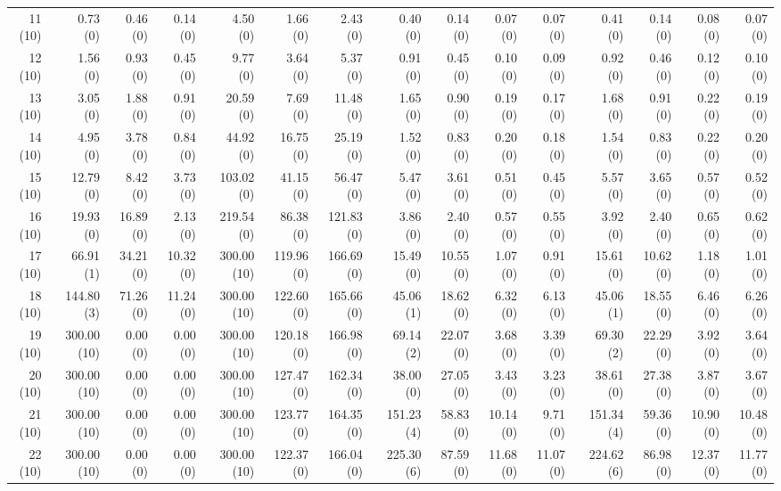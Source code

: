 \documentclass[11pt,fleqn,twoside]{article}
\begin{document}
{\begin{table}[t]
\begin{tabular}[t]{|r|r|r|r|r|r|r|r|r|r|r|r|r|r|r|}
11 (10) & 0.73 ~~(0) & 0.46 (0) & 0.14 (0) & 4.50 ~~(0) & 1.66 (0) & 2.43 (0) & 0.40 ~~(0) & 0.14 (0) & 0.07 (0) & 0.07 (0) & 0.41 ~~(0) & 0.14 (0) & 0.08 (0) & 0.07 (0) \\
12 (10) & 1.56 ~~(0) & 0.93 (0) & 0.45 (0) & 9.77 ~~(0) & 3.64 (0) & 5.37 (0) & 0.91 ~~(0) & 0.45 (0) & 0.10 (0) & 0.09 (0) & 0.92 ~~(0) & 0.46 (0) & 0.12 (0) & 0.10 (0) \\
13 (10) & 3.05 ~~(0) & 1.88 (0) & 0.91 (0) & 20.59 ~~(0) & 7.69 (0) & 11.48 (0) & 1.65 ~~(0) & 0.90 (0) & 0.19 (0) & 0.17 (0) & 1.68 ~~(0) & 0.91 (0) & 0.22 (0) & 0.19 (0) \\
14 (10) & 4.95 ~~(0) & 3.78 (0) & 0.84 (0) & 44.92 ~~(0) & 16.75 (0) & 25.19 (0) & 1.52 ~~(0) & 0.83 (0) & 0.20 (0) & 0.18 (0) & 1.54 ~~(0) & 0.83 (0) & 0.22 (0) & 0.20 (0) \\
15 (10) & 12.79 ~~(0) & 8.42 (0) & 3.73 (0) & 103.02 ~~(0) & 41.15 (0) & 56.47 (0) & 5.47 ~~(0) & 3.61 (0) & 0.51 (0) & 0.45 (0) & 5.57 ~~(0) & 3.65 (0) & 0.57 (0) & 0.52 (0) \\
16 (10) & 19.93 ~~(0) & 16.89 (0) & 2.13 (0) & 219.54 ~~(0) & 86.38 (0) & 121.83 (0) & 3.86 ~~(0) & 2.40 (0) & 0.57 (0) & 0.55 (0) & 3.92 ~~(0) & 2.40 (0) & 0.65 (0) & 0.62 (0) \\
17 (10) & 66.91 ~~(1) & 34.21 (0) & 10.32 (0) & 300.00 (10) & 119.96 (0) & 166.69 (0) & 15.49 ~~(0) & 10.55 (0) & 1.07 (0) & 0.91 (0) & 15.61 ~~(0) & 10.62 (0) & 1.18 (0) & 1.01 (0) \\
18 (10) & 144.80 ~~(3) & 71.26 (0) & 11.24 (0) & 300.00 (10) & 122.60 (0) & 165.66 (0) & 45.06 ~~(1) & 18.62 (0) & 6.32 (0) & 6.13 (0) & 45.06 ~~(1) & 18.55 (0) & 6.46 (0) & 6.26 (0) \\
19 (10) & 300.00 (10) & 0.00 (0) & 0.00 (0) & 300.00 (10) & 120.18 (0) & 166.98 (0) & 69.14 ~~(2) & 22.07 (0) & 3.68 (0) & 3.39 (0) & 69.30 ~~(2) & 22.29 (0) & 3.92 (0) & 3.64 (0) \\
20 (10) & 300.00 (10) & 0.00 (0) & 0.00 (0) & 300.00 (10) & 127.47 (0) & 162.34 (0) & 38.00 ~~(0) & 27.05 (0) & 3.43 (0) & 3.23 (0) & 38.61 ~~(0) & 27.38 (0) & 3.87 (0) & 3.67 (0) \\
21 (10) & 300.00 (10) & 0.00 (0) & 0.00 (0) & 300.00 (10) & 123.77 (0) & 164.35 (0) & 151.23 ~~(4) & 58.83 (0) & 10.14 (0) & 9.71 (0) & 151.34 ~~(4) & 59.36 (0) & 10.90 (0) & 10.48 (0) \\
22 (10) & 300.00 (10) & 0.00 (0) & 0.00 (0) & 300.00 (10) & 122.37 (0) & 166.04 (0) & 225.30 ~~(6) & 87.59 (0) & 11.68 (0) & 11.07 (0) & 224.62 ~~(6) & 86.98 (0) & 12.37 (0) & 11.77 (0) \\

\end{tabular}
\end{table}}
\end{document}
